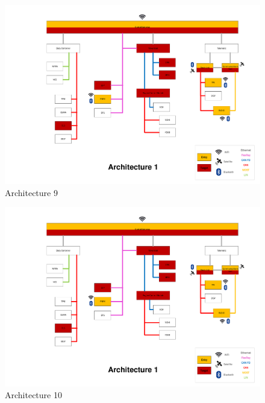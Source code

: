 \begin{figure}
    \caption{Architecture 9}
    \includegraphics[width=\textwidth, page=9]{../Architectures-survey.pdf}
\end{figure}

\begin{figure}
    \caption{Architecture 10}
    \includegraphics[width=\textwidth, page=10]{../Architectures-survey.pdf}
\end{figure}